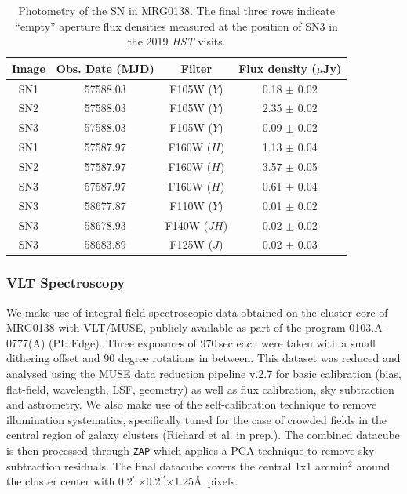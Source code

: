 \documentclass[12pt]{article}
\gdef\arcsec{$^{\prime\prime}$}
\begin{document}
\begin{table}[ht]
\centering
\begin{tabular}{cccc}
Image & Obs. Date (MJD) & Filter & Flux density ($\mu$Jy) \\
\midrule
SN1 & 57588.03 & F105W ($Y$) & 0.18  $\pm$ 0.02 \\
SN2 & 57588.03 & F105W ($Y$) & 2.35  $\pm$ 0.02 \\
SN3 & 57588.03 & F105W ($Y$) & 0.09  $\pm$ 0.02 \\
SN1 & 57587.97 & F160W ($H$) & 1.13  $\pm$ 0.04 \\
SN2 & 57587.97 & F160W ($H$) & 3.57  $\pm$ 0.05 \\
SN3 & 57587.97 & F160W ($H$) & 0.61  $\pm$ 0.04 \\
\midrule
SN3 & 58677.87 & F110W ($Y$) & 0.01  $\pm$ 0.02 \\
SN3 & 58678.93 & F140W ($JH$) & 0.02  $\pm$ 0.02 \\
SN3 & 58683.89 & F125W ($J$) & 0.02  $\pm$ 0.03 \\
\end{tabular}
\caption{Photometry of the SN in MRG0138.  The final three rows indicate ``empty'' aperture flux densities measured at the position of SN3 in the 2019 \textit{HST} visits.
\label{tab:photometry}}
\end{table}


\subsubsection*{VLT Spectroscopy}
\label{sec:vltmuse}

We make use of integral field spectroscopic data obtained on the cluster core of MRG0138 with VLT/MUSE, publicly 
available as part of the program 0103.A-0777(A) (PI: Edge). Three exposures of 970\,sec each were taken with a small dithering offset and 90 degree rotations in between. This dataset was reduced and analysed using the MUSE data reduction pipeline v.2.7 \cite{weilbacher_data_2020} for basic calibration (bias, flat-field, wavelength, LSF, geometry) as well as flux calibration, sky subtraction and astrometry.  We  also make use of the self-calibration technique \cite{bacon_muse_2017} to remove illumination systematics, specifically tuned for the case of crowded fields in the central region of galaxy clusters (Richard et al. in prep.). The combined datacube is then processed through {\tt ZAP} \cite{soto_zap_2016} which applies a PCA technique to remove sky subtraction residuals. The final datacube covers the central 1x1 arcmin$^2$ around the cluster center with 0.2\arcsec$\times$0.2\arcsec$\times$1.25\AA\ pixels.
\end{document}
